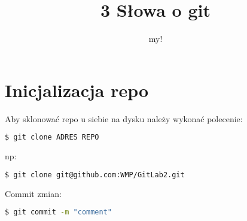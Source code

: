 \documentclass[12pt,a4paper]{report}
\author{my!}
\title{3 Słowa o git}
\begin{document}
\maketitle

\chapter{Inicjalizacja repo}
Aby sklonować repo u siebie na dysku należy wykonać polecenie:
\begin{lstlisting}[language=bash]
  $ git clone ADRES REPO
\end{lstlisting}
np:
\begin{lstlisting}[language=bash]
  $ git clone git@github.com:WMP/GitLab2.git
\end{lstlisting}

Commit zmian:
\begin{lstlisting}[language=bash]
  $ git commit -m "comment"
\end{lstlisting}
\end{document}
